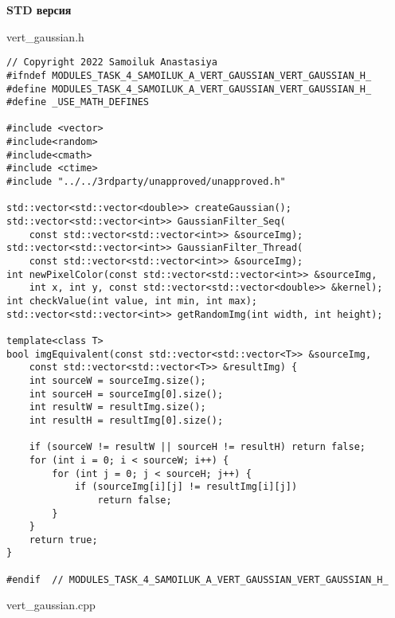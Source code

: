 \documentclass{report}
\begin{document}
\textbf{STD версия}
\par vert\_gaussian.h
\begin{lstlisting}
// Copyright 2022 Samoiluk Anastasiya
#ifndef MODULES_TASK_4_SAMOILUK_A_VERT_GAUSSIAN_VERT_GAUSSIAN_H_
#define MODULES_TASK_4_SAMOILUK_A_VERT_GAUSSIAN_VERT_GAUSSIAN_H_
#define _USE_MATH_DEFINES

#include <vector>
#include<random>
#include<cmath>
#include <ctime>
#include "../../3rdparty/unapproved/unapproved.h"

std::vector<std::vector<double>> createGaussian();
std::vector<std::vector<int>> GaussianFilter_Seq(
    const std::vector<std::vector<int>> &sourceImg);
std::vector<std::vector<int>> GaussianFilter_Thread(
    const std::vector<std::vector<int>> &sourceImg);
int newPixelColor(const std::vector<std::vector<int>> &sourceImg,
    int x, int y, const std::vector<std::vector<double>> &kernel);
int checkValue(int value, int min, int max);
std::vector<std::vector<int>> getRandomImg(int width, int height);

template<class T>
bool imgEquivalent(const std::vector<std::vector<T>> &sourceImg,
    const std::vector<std::vector<T>> &resultImg) {
    int sourceW = sourceImg.size();
    int sourceH = sourceImg[0].size();
    int resultW = resultImg.size();
    int resultH = resultImg[0].size();

    if (sourceW != resultW || sourceH != resultH) return false;
    for (int i = 0; i < sourceW; i++) {
        for (int j = 0; j < sourceH; j++) {
            if (sourceImg[i][j] != resultImg[i][j])
                return false;
        }
    }
    return true;
}

#endif  // MODULES_TASK_4_SAMOILUK_A_VERT_GAUSSIAN_VERT_GAUSSIAN_H_
\end{lstlisting}
\par vert\_gaussian.cpp
\end{document}
